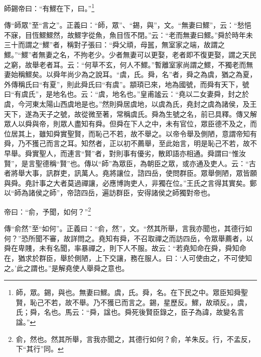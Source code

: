 師錫帝曰：“有鰥在下，曰。”\footnote{師，眾。錫，與也。無妻曰鰥。虞，氏。舜，名。在下民之中。眾臣知舜聖賢，恥己不若，故不舉。乃不獲已而言之。錫，星歷反。鰥，故頑反。，虞，氏；舜，名也。馬云：“舜，諡也。舜死後賢臣錄之，臣子為諱，故變名言諡。”}

{\noindent\zhuan{}\fzbyks 傳“師眾”至“言之”。正義曰：“師，眾”、“錫，與”，文。“無妻曰鰥”，云：“愁悒不寐，目恆鰥鰥然，故鰥字從魚，魚目恆不閉。”云：“老而無妻曰鰥。”舜於時年未三十而謂之“鰥”者，稱對子張曰：“舜父頑，母嚚，無室家之端，故謂之鰥。”“鰥”者無妻之名，不拘老少。少者無妻可以更娶，老者即不復更娶，謂之天民之窮，故舉老者耳。云：“何草不玄，何人不鰥。”暫離室家尚謂之鰥，不獨老而無妻始稱鰥矣。以舜年尚少為之說耳。“虞，氏。舜，名”者，舜之為虞，猶之為夏，外傳稱氏曰“有夏”，則此舜氏曰“有虞”。顓頊已來，地為國號，而舜有天下，號曰“有虞氏”，是地名也。云：“虞，地名也。”皇甫謐云：“堯以二女妻舜，封之於虞，今河東太陽山西虞地是也。”然則舜居虞地，以虞為氏，堯封之虞為諸侯，及王天下，遂為天子之號，故從微至著，常稱虞氏。舜為生號之名，前已具釋。傳又解眾人以舜與帝，則眾人盡知有舜。但舜在下人之中，未有官位，眾臣德不及之，而位居其上，雖知舜實聖賢，而恥己不若，故不舉之。以帝令舉及側陋，意謂帝知有舜，乃不獲己而言之耳。知然者，正以初不薦舉，至此始言，明是恥己不若，故不早舉。舜實聖人，而連言“賢”者，對則事有優劣，散即語亦相通。舜謂曰“惟汝賢”，是言聖德稱“賢”也。傳以“師”為眾臣，為朝臣之眾，或亦通及吏人。云：“古者將舉大事，訊群吏，訊萬人。堯將讓位，諮四岳，使問群臣。眾舉側陋，眾皆願與舜。堯計事之大者莫過禪讓，必應博詢吏人，非獨在位。”王氏之言得其實矣。鄭以“師為諸侯之師”，帝諮四岳，遍訪群臣，安得諸侯之師獨對帝也。 \par}

帝曰：“俞，予聞，如何？”\footnote{俞，然也。然其所舉，言我亦聞之，其德行如何？俞，羊朱反。行，不孟反，下“其行”同。}

{\noindent\zhuan{}\fzbyks 傳“俞然”至“如何”。正義曰：“俞，然”，文。“然其所舉，言我亦聞也，其德行如何？”恐所聞不審，故詳問之。堯知有舜，不召取禪之而訪四岳，令眾舉薦者，以舜在卑賤，未有名聞，率暴禪之，則下人不服。故云：“若堯知命在舜，舜知命在，猶求於群臣，舉於側陋，上下交讓，務在服人。曰：‘人可使由之，不可使知之。’此之謂也。”是解堯使人舉舜之意也。 \par}

